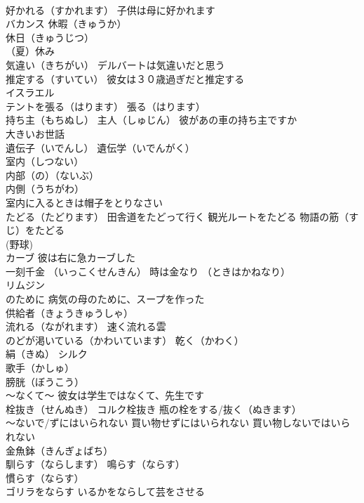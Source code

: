 \documentclass[8pt]{extreport}
\begin{document}
\begin{CJK}{UTF8}{min}
\\	好かれる（すかれます） 子供は母に好かれます
\\	バカンス 休暇（きゅうか）
\\	休日（きゅうじつ）
\\	（夏）休み
\\	気違い（きちがい） デルバートは気違いだと思う
\\	推定する（すいてい） 彼女は３０歳過ぎだと推定する
\\	イスラエル
\\	テントを張る（はります） 張る（はります）
\\	持ち主（もちぬし） 主人（しゅじん） 彼があの車の持ち主ですか
\\	大きいお世話
\\	遺伝子（いでんし） 遺伝学（いでんがく）
\\	室内（しつない）
\\	内部（の）（ないぶ）
\\	内側（うちがわ）
\\	室内に入るときは帽子をとりなさい
\\	たどる（たどります） 田舎道をたどって行く 観光ルートをたどる 物語の筋（すじ）をたどる
\\	(野球) 
\\	カーブ 彼は右に急カーブした
\\	一刻千金 （いっこくせんきん） 時は金なり （ときはかねなり）
\\	リムジン
\\	のために 病気の母のために、スープを作った
\\	供給者（きょうきゅうしゃ）
\\	流れる（ながれます） 速く流れる雲
\\	のどが渇いている（かわいています） 乾く（かわく）
\\	絹（きぬ） シルク 
\\	歌手（かしゅ）
\\	膀胱（ぼうこう）
\\	～なくて～ 彼女は学生ではなくて、先生です
\\	栓抜き（せんぬき） コルク栓抜き 瓶の栓をする/抜く（ぬきます）
\\	～ないで/ずにはいられない 買い物せずにはいられない 買い物しないではいられない
\\	金魚鉢（きんぎょばち）
\\	馴らす（ならします） 鳴らす（ならす）
\\	慣らす（ならす）
\\	ゴリラをならす いるかをならして芸をさせる

\end{CJK}
\end{document}
